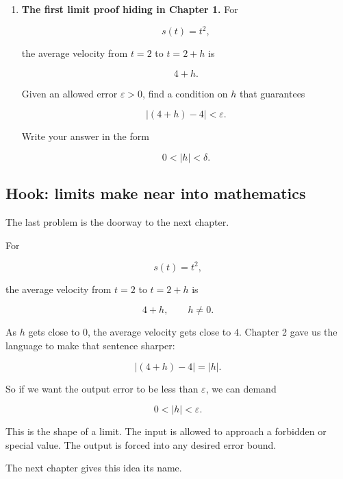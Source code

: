 \begin{enumerate}
\[
\frac{f(a+h)-f(a)}{h}
\]

is naturally studied on a punctured interval around \(h=0\), rather than on an interval that includes \(h=0\).

\item \textbf{The first limit proof hiding in Chapter 1.}
For

\[
s(t)=t^2,
\]

the average velocity from \(t=2\) to \(t=2+h\) is

\[
4+h.
\]

Given an allowed error \(\varepsilon>0\), find a condition on \(h\) that guarantees

\[
|(4+h)-4|<\varepsilon.
\]

Write your answer in the form

\[
0<|h|<\delta.
\]
\end{enumerate}

\subsection{Hook: limits make near into mathematics}
\label{subsec:hook-limits-make-near}

The last problem is the doorway to the next chapter.

For

\[
s(t)=t^2,
\]

the average velocity from \(t=2\) to \(t=2+h\) is

\[
4+h,
\qquad h\neq0.
\]

As \(h\) gets close to \(0\), the average velocity gets close to \(4\). Chapter 2 gave us the language to make that sentence sharper:

\[
|(4+h)-4|=|h|.
\]

So if we want the output error to be less than \(\varepsilon\), we can demand

\[
0<|h|<\varepsilon.
\]

This is the shape of a limit. The input is allowed to approach a forbidden or special value. The output is forced into any desired error bound.

The next chapter gives this idea its name.

